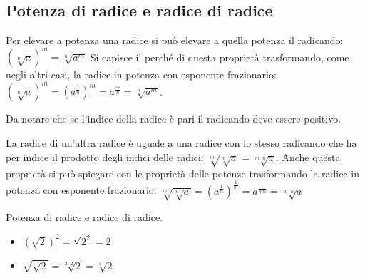\subsection{Potenza di radice e radice di radice}

Per elevare a potenza una radice si può elevare a quella potenza il 
radicando: \(\left(\sqrt[n]a\right)^m=\sqrt[n]{a^m}\)
Si capisce il perché di questa proprietà trasformando, come negli altri 
casi, la radice in potenza con esponente frazionario:
\(\left(\sqrt[n]a\right)^m=\left(a^{\frac 1 n}\right)^m=a^{\frac m n}=
\sqrt[n]{a^m}\).
\begin{osservazione}{}{}
Da notare che se l'indice della radice è pari il radicando deve essere 
positivo.
\end{osservazione}


La radice di un'altra radice è uguale a una radice con lo stesso radicando 
che ha per indice il prodotto degli indici delle radici: 
\(\sqrt[m]{\sqrt[n]a}=\sqrt[m\cdot n]a\). 
Anche questa proprietà si può spiegare con le proprietà delle potenze 
trasformando la radice in potenza con esponente frazionario: 
\(\sqrt[m]{\sqrt[n]a}=\left(a^{\frac 1 n}\right)^{\frac 1 m}=
a^{\frac 1{mn}}=\sqrt[m\cdot n]a\)

\vspace{-.5em}
% 
\begin{esempio}{}{}
Potenza di radice e radice di radice.
\begin{htmulticols}{2}
\begin{itemize}
\item \(\left(\sqrt{2}\right)^2=\sqrt{2^2}=2\)
\item \(\sqrt{\sqrt{2}}=\sqrt[2\cdot 2]2=\sqrt[4]2\)
\end{itemize}
\end{htmulticols}
\end{esempio}

